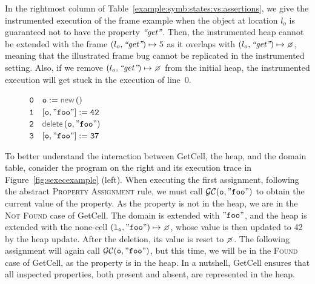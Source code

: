  
 
 In the rightmost column of Table~\ref{example:symb:states:vs:assertions}, we give the instrumented 
 execution of the frame example when
 the object at location $l_o$ is guaranteed not to have the property $\text{{\it ``get''}}$. 
 Then, the  instrumented heap cannot be extended  with 
 the frame $(l_o, \text{{\it ``get''}}) \mapsto 5$ as it overlaps with $(\loc_o, \litstring{get}) \mapsto \none$, meaning 
 that the illustrated frame bug cannot be replicated in the instrumented setting.  
 Also, if we remove $(\loc_o, \litstring{get}) \mapsto \none$ from the initial heap, 
 the instrumented execution will get stuck in the execution of line~$0$. 

\begin{figure}
\vspace*{-0.27cm}
{\small
\hspace*{-0.5cm} $\mathtt{0\quad o := \jsilnew ()}$ \\
\hspace*{-0.5cm} $\mathtt{1\quad [o, "foo"] := 42}$ \\
\hspace*{-0.5cm} $\mathtt{2\quad \jsildelete(o, "foo")}$ \\ 
\hspace*{-0.5cm} $\mathtt{3\quad [o, "foo"] := 37}$ 
}
\vspace*{-0.2cm}
\end{figure}




To better understand the interaction between GetCell, the heap, and the domain table, consider the program on the right and its execution trace in Figure~\ref{fig:sexecexample} (left). When executing the first assignment, following the abstract \textsc{Property Assignment} rule, we must call $\mathcal{GC}(\mathtt{o, "foo"})$ to obtain the current value of the property. As the property is not in the heap, we are in the \textsc{Not Found} case of GetCell. The domain is extended with $\mathtt{"foo"}$, and the heap is extended with the none-cell $\mathtt{(\loc_o, "foo")} \mapsto \none$, whose value is then updated to 42 by the heap update. After the deletion, its value is reset to $\none$. The following assignment will again call $\mathcal{GC}(\mathtt{o, "foo"})$, but this time, we will be in the \textsc{Found} case of GetCell, as the property is in the heap.
In a nutshell, GetCell ensures that all inspected properties, both present and absent, are represented in the heap.

